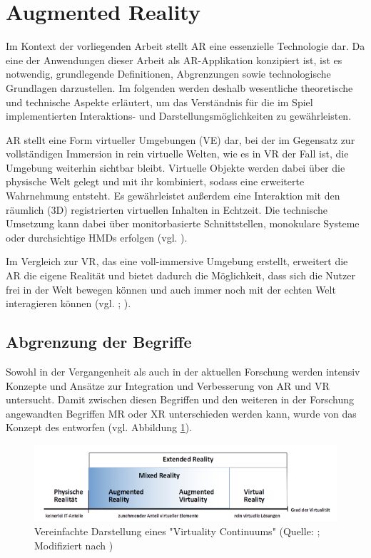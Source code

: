\section{Augmented Reality}
Im Kontext der vorliegenden Arbeit stellt \ac{AR} eine essenzielle Technologie dar. Da eine der Anwendungen dieser Arbeit als \ac{AR}-Applikation konzipiert ist, ist es notwendig, grundlegende Definitionen, Abgrenzungen sowie technologische Grundlagen darzustellen. Im folgenden werden deshalb wesentliche theoretische und technische Aspekte erläutert, um das Verständnis für die im Spiel implementierten Interaktions- und Darstellungsmöglichkeiten zu gewährleisten.

\ac{AR} stellt eine Form virtueller Umgebungen (\ac{VE}) dar, bei der im Gegensatz zur vollständigen Immersion in rein virtuelle Welten, wie es in \ac{VR} der Fall ist, die Umgebung weiterhin sichtbar bleibt. Virtuelle Objekte werden dabei über die physische Welt gelegt und mit ihr kombiniert, sodass eine erweiterte Wahrnehmung entsteht. Es gewährleistet außerdem eine Interaktion mit den räumlich (\ac{3D}) registrierten virtuellen Inhalten in Echtzeit. Die technische Umsetzung kann dabei über monitorbasierte Schnittstellen, monokulare Systeme oder durchsichtige \ac{HMD}s erfolgen (vgl. \cite[S. 2f]{azuma_survey_1997}).

Im Vergleich zur \ac{VR}, das eine voll-immersive Umgebung erstellt, erweitert die \ac{AR} die eigene Realität und bietet dadurch die Möglichkeit, dass sich die Nutzer frei in der Welt bewegen können und auch immer noch mit der echten Welt interagieren können (vgl. \citealp[S. 79]{billinghurst_survey_2015}; \citealp[S. 1]{stefanidi_meaningful_2024}).

\subsection{Abgrenzung der Begriffe}
Sowohl in der Vergangenheit als auch in der aktuellen Forschung werden intensiv Konzepte und Ansätze zur Integration und Verbesserung von \ac{AR} und \ac{VR} untersucht. Damit zwischen diesen Begriffen und den weiteren in der Forschung angewandten Begriffen \ac{MR} oder \ac{XR} unterschieden werden kann, wurde von  \cite{milgram_taxonomy_1994} das Konzept des  entworfen (vgl. Abbildung \ref{fig:virtuality-continuum}).

\begin{figure}[ht]
\centering
\includegraphics[width=1\linewidth]{content/pictures/virtuality-continuum_upscaled.PNG}
\caption{Vereinfachte Darstellung eines "Virtuality Continuums" (Quelle: \citealp[S. 9]{knoll_augmented_2022}; Modifiziert nach \citealp[S. 3]{milgram_taxonomy_1994})}
\label{fig:virtuality-continuum}
\end{figure}

